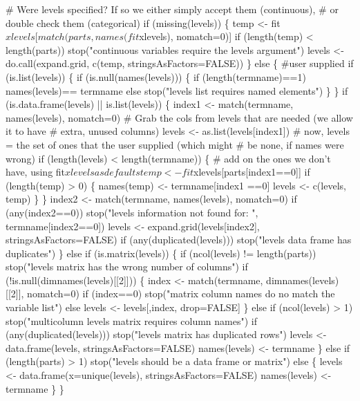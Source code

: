 \documentclass{article}
\begin{document}
\begin{nwchunk}
     # Were levels specified?  If so we either simply accept them (continuous),
     #  or double check them (categorical)
     if (missing(levels)) \{
         temp <- fit$xlevels[match(parts, names(fit$xlevels), nomatch=0)]
         if (length(temp) < length(parts))
             stop("continuous variables require the levels argument")
         levels <- do.call(expand.grid, c(temp, stringsAsFactors=FALSE))
     \}
     else \{  #user supplied
         if (is.list(levels)) \{
             if (is.null(names(levels))) \{
                 if (length(termname)==1) names(levels)== termname
                 else stop("levels list requires named elements")
             \}
         \}
         if (is.data.frame(levels) || is.list(levels)) \{
             index1 <- match(termname, names(levels), nomatch=0)
             # Grab the cols from levels that are needed (we allow it to have
             #  extra, unused columns)
             levels <- as.list(levels[index1])
             # now, levels = the set of ones that the user supplied (which might
             #   be none, if names were wrong)
             if (length(levels) < length(termname)) \{
                 # add on the ones we don't have, using fit$xlevels as defaults
                 temp <- fit$xlevels[parts[index1==0]]
                 if (length(temp) > 0) \{
                     names(temp) <- termname[index1 ==0]
                     levels <- c(levels, temp)
                 \}
             \} 
             index2 <- match(termname, names(levels), nomatch=0)
             if (any(index2==0)) 
                 stop("levels information not found for: ", termname[index2==0])
             levels <- expand.grid(levels[index2], stringsAsFactors=FALSE)
             if (any(duplicated(levels))) stop("levels data frame has duplicates")
         \}
         else if (is.matrix(levels)) \{
             if (ncol(levels) != length(parts))
                 stop("levels matrix has the wrong number of columns")
             if (!is.null(dimnames(levels)[[2]])) \{
                 index <- match(termname, dimnames(levels)[[2]], nomatch=0)
                 if (index==0)
                     stop("matrix column names do no match the variable list")
                 else levels <- levels[,index, drop=FALSE]
             \} else if (ncol(levels) > 1) 
                 stop("multicolumn levels matrix requires column names")
             if (any(duplicated(levels)))
                 stop("levels matrix has duplicated rows")
             levels <- data.frame(levels, stringsAsFactors=FALSE)
             names(levels) <- termname
          \}
         else if (length(parts) > 1)
             stop("levels should be a data frame or matrix")
         else \{
             levels <- data.frame(x=unique(levels), stringsAsFactors=FALSE)
             names(levels) <- termname
         \}       
     \}
 

\end{nwchunk}
\end{document}

